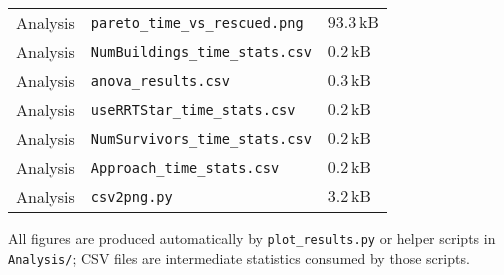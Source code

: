 \begin{tabular}{@{}lll@{}}
Analysis & \texttt{pareto_time_vs_rescued.png} & $93.3\,\text{kB}$ \\
Analysis & \texttt{NumBuildings_time_stats.csv} & $0.2\,\text{kB}$ \\
Analysis & \texttt{anova_results.csv} & $0.3\,\text{kB}$ \\
Analysis & \texttt{useRRTStar_time_stats.csv} & $0.2\,\text{kB}$ \\
Analysis & \texttt{NumSurvivors_time_stats.csv} & $0.2\,\text{kB}$ \\
Analysis & \texttt{Approach_time_stats.csv} & $0.2\,\text{kB}$ \\
Analysis & \texttt{csv2png.py} & $3.2\,\text{kB}$ \\
\bottomrule
\end{tabular}

\noindent All figures are produced automatically by
\texttt{plot\_results.py} or helper scripts in \texttt{Analysis/}; CSV
files are intermediate statistics consumed by those scripts.
